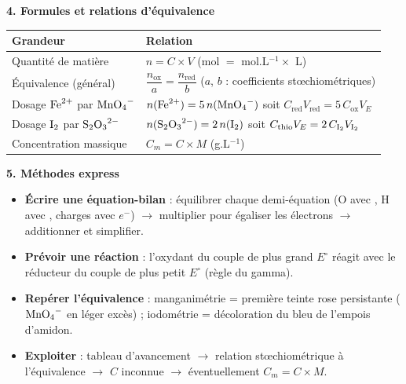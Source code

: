 \documentclass[11pt]{article}
\begin{document}
\begin{bilan}
\textbf{4. Formules et relations d'équivalence}
\begin{center}
\begin{tabularx}{\linewidth}{|l|X|}
\hline
\rowcolor{poporangeL} \textbf{Grandeur} & \textbf{Relation} \\
\hline
Quantité de matière & $n = C \times V$ \quad (mol $=$ mol.L$^{-1}\times$ L) \\
\hline
Équivalence (général) & $\dfrac{n_{\text{ox}}}{a} = \dfrac{n_{\text{red}}}{b}$ \quad ($a$, $b$ : coefficients stœchiométriques) \\
\hline
Dosage $\ce{Fe^2+}$ par $\ce{MnO4-}$ & $n(\ce{Fe^2+}) = 5\,n(\ce{MnO4-})$ \; soit \; $C_{\text{red}}V_{\text{red}} = 5\,C_{\text{ox}}V_{E}$ \\
\hline
Dosage $\ce{I2}$ par $\ce{S2O3^2-}$ & $n(\ce{S2O3^2-}) = 2\,n(\ce{I2})$ \; soit \; $C_{\text{thio}}V_{E} = 2\,C_{\ce{I2}}V_{\ce{I2}}$ \\
\hline
Concentration massique & $C_m = C \times M$ \quad (g.L$^{-1}$) \\
\hline
\end{tabularx}
\end{center}

\textbf{5. Méthodes express}
\begin{itemize}
  \item \textbf{Écrire une équation-bilan} : équilibrer chaque demi-équation (O avec , H avec , charges avec $e^-$) $\rightarrow$ multiplier pour égaliser les électrons $\rightarrow$ additionner et simplifier.
  \item \textbf{Prévoir une réaction} : l'oxydant du couple de plus grand $E^\circ$ réagit avec le réducteur du couple de plus petit $E^\circ$ (règle du gamma).
  \item \textbf{Repérer l'équivalence} : manganimétrie = première teinte rose persistante ($\ce{MnO4-}$ en léger excès) ; iodométrie = décoloration du bleu de l'empois d'amidon.
  \item \textbf{Exploiter} : tableau d'avancement $\rightarrow$ relation stœchiométrique à l'équivalence $\rightarrow$ $C$ inconnue $\rightarrow$ éventuellement $C_m = C \times M$.
\end{itemize}
\end{bilan}
\end{document}
